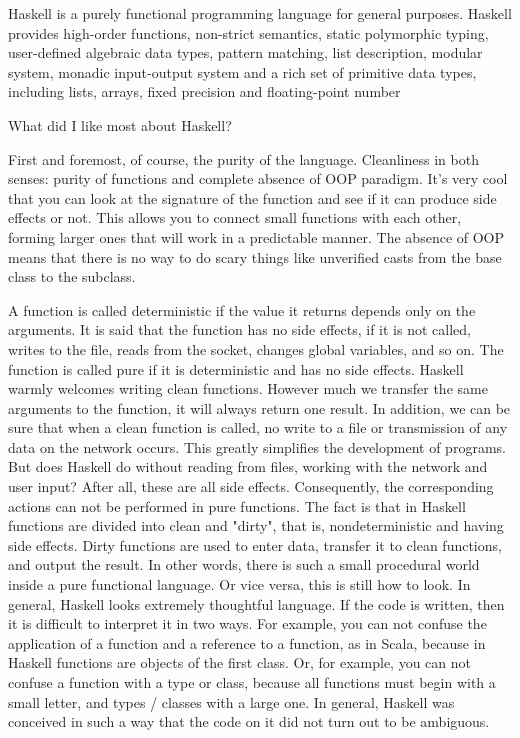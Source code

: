 \documentclass[14pt]{article}
\begin{document}
Haskell is a purely functional programming language for general purposes.  Haskell provides high-order functions, non-strict semantics, static polymorphic typing, user-defined algebraic data types, pattern matching, list description, modular system, monadic input-output system and a rich set of primitive data types, including lists, arrays,  fixed precision and floating-point number 

What did I like most about Haskell?  

First and foremost, of course, the purity of the language.  Cleanliness in both senses: purity of functions and complete absence of OOP paradigm.  It's very cool that you can look at the signature of the function and see if it can produce side effects or not.  This allows you to connect small functions with each other, forming larger ones that will work in a predictable manner.  The absence of OOP means that there is no way to do scary things like unverified casts from the base class to the subclass.

A function is called deterministic if the value it returns depends only on the arguments.  It is said that the function has no side effects, if it is not called, writes to the file, reads from the socket, changes global variables, and so on.  The function is called pure if it is deterministic and has no side effects.  Haskell warmly welcomes writing clean functions.  However much we transfer the same arguments to the function, it will always return one result.  In addition, we can be sure that when a clean function is called, no write to a file or transmission of any data on the network occurs.  This greatly simplifies the development of programs.  But does Haskell do without reading from files, working with the network and user input?  After all, these are all side effects.  Consequently, the corresponding actions can not be performed in pure functions.  The fact is that in Haskell functions are divided into clean and "dirty", that is, nondeterministic and having side effects.  Dirty functions are used to enter data, transfer it to clean functions, and output the result.  In other words, there is such a small procedural world inside a pure functional language.  Or vice versa, this is still how to look.  In general, Haskell looks extremely thoughtful language.  If the code is written, then it is difficult to interpret it in two ways.  For example, you can not confuse the application of a function and a reference to a function, as in Scala, because  in Haskell functions are objects of the first class.  Or, for example, you can not confuse a function with a type or class, because  all functions must begin with a small letter, and types / classes with a large one.  In general, Haskell was conceived in such a way that the code on it did not turn out to be ambiguous. 
\end{document}
